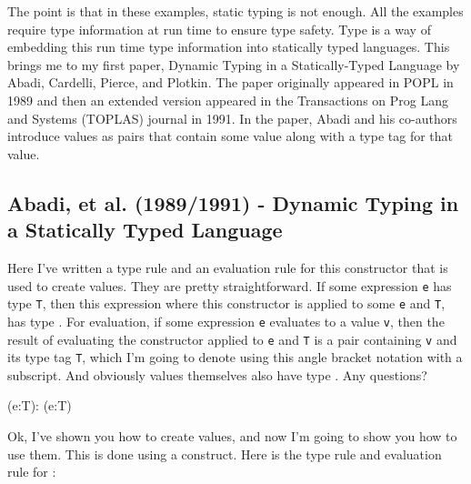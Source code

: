 \documentclass[12pt]{article}	%
\begin{document}
The point is that in these examples, static typing is not enough. All the examples require type information at run time to ensure type safety. Type \Dynamic is a way of embedding this run time type information into statically typed languages. This brings me to my first paper, Dynamic Typing in a Statically-Typed Language by Abadi, Cardelli, Pierce, and Plotkin. The paper originally appeared in POPL in 1989 and then an extended version appeared in the Transactions on Prog Lang and Systems (TOPLAS) journal in 1991. In the paper, Abadi and his co-authors introduce \Dynamic values as pairs that contain some value along with a type tag for that value. 

\subsection*{Abadi, et al. (1989/1991) - Dynamic Typing in a Statically Typed Language}


Here I've written a type rule and an evaluation rule for this \dynamic constructor that is used to create \Dynamic values. They are pretty straightforward. If some expression \texttt{e} has type \texttt{T}, then this expression where this \dynamic constructor is applied to some \texttt{e} and \texttt{T}, has type \Dynamic. For evaluation, if some expression \texttt{e} evaluates to a value \texttt{v}, then the result of evaluating the \dynamic constructor applied to \texttt{e} and \texttt{T} is a pair containing \texttt{v} and its type tag \texttt{T}, which I'm going to denote using this angle bracket notation with a subscript. And obviously \Dynamic values themselves also have type \Dynamic. Any questions?


          { \Gamma\vdash (\dynamic\;e:T):\Dynamic }
          { (\dynamic\;e:T) \eval {} }

$\;$\\


Ok, I've shown you how to create \Dynamic values, and now I'm going to show you how to use them. This is done using a \typecase construct. Here is the type rule and evaluation rule for \typecase:
\end{document}
